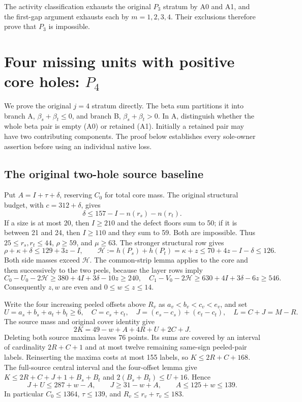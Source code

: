 \documentclass[11pt,letterpaper]{article}
\theoremstyle{definition}\newtheorem{definition}[theorem]{Definition}
\begin{document}
The activity classification exhausts the original $P_3$ stratum by A0
and A1, and the first-gap argument exhausts each by $m=1,2,3,4$.
Their exclusions therefore prove that $P_3$ is impossible.


\section{Four missing units with positive core holes: $P_4$}\label{sec:p4}
We prove the original $j=4$ stratum directly. The beta sum partitions it
into branch A, $\beta_s+\beta_t\le0$, and branch B,
$\beta_s+\beta_t>0$. In A, distinguish whether the whole beta pair is empty
(A0) or retained (A1). Initially a retained pair may have two contributing
components. The proof below establishes every sole-owner assertion before
using an individual native loss.

\subsection{The original two-hole source baseline}\label{subsec:p4-baseline}
Put $A=I+\tau+\delta$, reserving $C_0$ for total core mass.
The original structural budget, with $c=312+\delta$, gives
\[
 \delta\le157-I-n(r_s)-n(r_t).
\]
If a size is at most 20, then $I\ge210$ and the defect floors sum to 50;
if it is between 21 and 24, then $I\ge110$ and they sum to 59.
Both are impossible. Thus $25\le r_s,r_t\le44$, $\rho\ge59$, and
$\mu\ge63$. The stronger structural row gives
\[
 \rho+\kappa+\delta\le129+3z-I,\qquad
 \mathcal H:=h(P_s)+h(P_t)=\kappa+z\le70+4z-I-\delta\le126.
\]
Both side masses exceed $\mathcal H$. The common-strip lemma applies to
the core and then successively to the two peels, because the layer rows
imply
\[
 C_0-U_0-2\mathcal H\ge380+4I+3\delta-10z\ge240,
 \quad C_1-V_0-2\mathcal H\ge630+4I+3\delta-6z\ge546.
\]
Consequently $z,w$ are even and $0\le w\le z\le14$.

Write the four increasing peeled offsets above $R_v$ as
$a_v<b_v<c_v<e_v$, and set
\[
 U=a_s+b_s+a_t+b_t\ge6,\quad C=c_s+c_t,\quad
 J=(e_s-c_s)+(e_t-c_t),\quad L=C+J=M-R.
\]
The source mass and original cover identity give
\begin{equation}
 2K=49-w+A+4R+U+2C+J.                         \label{eq:p4-initialmass}
\end{equation}
Deleting both source maxima leaves 76 points. Its sums are covered by
an interval of cardinality $2R+C+1$ and at most twelve remaining
same-sign peeled-pair labels. Reinserting the maxima costs at most 155
labels, so $K\le2R+C+168$. The full-source central interval and the
four-offset lemma give $K\le2R+C+J+1+B_s+B_t$ and
$2(B_s+B_t)\le U+16$. Hence
\[
 J+U\le287+w-A,\qquad J\ge31-w+A,\qquad A\le125+w\le139.
                                                        \tag{P4-mass}
\]
In particular $C_0\le1364$, $\tau\le139$, and
$R_v\le r_v+\tau_v\le183$.
\end{document}
